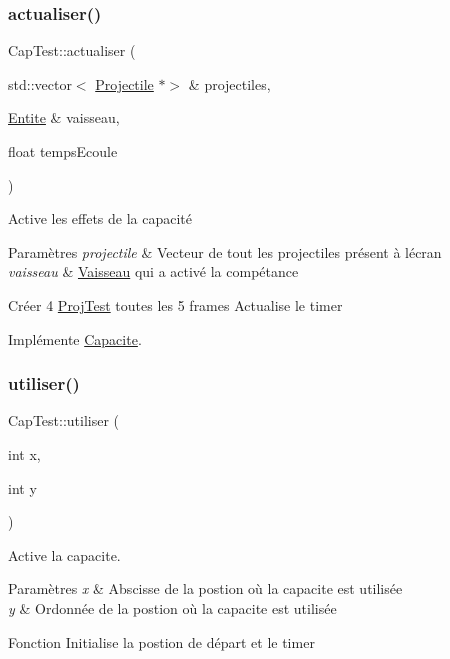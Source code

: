 \subsubsection{\texorpdfstring{actualiser()}{actualiser()}}
{\footnotesize\ttfamily Cap\+Test\+::actualiser (\begin{DoxyParamCaption}\item[{std\+::vector$<$ \hyperlink{class_projectile}{Projectile} $\ast$$>$ \&}]{projectiles,  }\item[{\hyperlink{class_entite}{Entite} \&}]{vaisseau,  }\item[{float}]{temps\+Ecoule }\end{DoxyParamCaption})\hspace{0.3cm}{\ttfamily [virtual]}}



Active les effets de la capacité 


\begin{DoxyParams}{Paramètres}
{\em projectile} & Vecteur de tout les projectiles présent à l\textquotesingle{}écran \\
\hline
{\em vaisseau} & \hyperlink{class_vaisseau}{Vaisseau} qui a activé la compétance\\
\hline
\end{DoxyParams}
Créer 4 \hyperlink{class_proj_test}{Proj\+Test} toutes les 5 frames Actualise le timer 

Implémente \hyperlink{class_capacite_a75c9621d7a704fedb10ad29c6a697d64}{Capacite}.

\mbox{\label{class_cap_test_a9c85a17dec6cf78f1438b08b175f650d}} 
\subsubsection{\texorpdfstring{utiliser()}{utiliser()}}
{\footnotesize\ttfamily Cap\+Test\+::utiliser (\begin{DoxyParamCaption}\item[{int}]{x,  }\item[{int}]{y }\end{DoxyParamCaption})\hspace{0.3cm}{\ttfamily [virtual]}}



Active la capacite. 


\begin{DoxyParams}{Paramètres}
{\em x} & Abscisse de la postion où la capacite est utilisée \\
\hline
{\em y} & Ordonnée de la postion où la capacite est utilisée\\
\hline
\end{DoxyParams}
Fonction Initialise la postion de départ et le timer 

